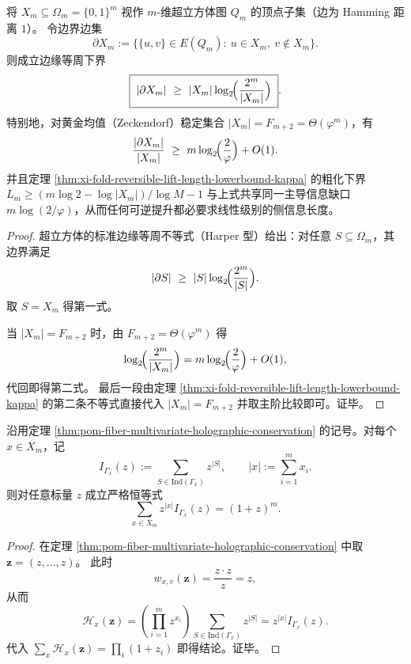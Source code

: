 \begin{proposition}[边界膨胀与信息缺口的同尺度性]\label{prop:xi-fold-boundary-info-gap-same-scale}
将 \(X_m\subseteq\Omega_m=\{0,1\}^m\) 视作 \(m\)-维超立方体图 \(Q_m\) 的顶点子集（边为 Hamming 距离 \(1\)）。
令边界边集
\[
\partial X_m:=\bigl\{\{u,v\}\in E(Q_m):\ u\in X_m,\ v\notin X_m\bigr\}.
\]
则成立边缘等周下界
\[
\boxed{\;
|\partial X_m|
\ \ge\
|X_m|\log_2\!\Bigl(\frac{2^m}{|X_m|}\Bigr)\; }.
\]
特别地，对黄金均值（Zeckendorf）稳定集合 \(|X_m|=F_{m+2}=\Theta(\varphi^m)\)，有
\[
\frac{|\partial X_m|}{|X_m|}
\ \ge\
m\log_2\!\Bigl(\frac{2}{\varphi}\Bigr)+O(1).
\]
并且定理 \ref{thm:xi-fold-reversible-lift-length-lowerbound-kappa} 的粗化下界
\(
L_m\ge (m\log2-\log|X_m|)/\log M-1
\)
与上式共享同一主导信息缺口 \(m\log(2/\varphi)\)，从而任何可逆提升都必要求线性级别的侧信息长度。
\end{proposition}
\begin{proof}
超立方体的标准边缘等周不等式（Harper 型）给出：对任意 \(S\subseteq\Omega_m\)，其边界满足
\[
|\partial S|\ \ge\ |S|\log_2\!\Bigl(\frac{2^m}{|S|}\Bigr).
\]
取 \(S=X_m\) 得第一式。
\par
当 \(|X_m|=F_{m+2}\) 时，由 \(F_{m+2}=\Theta(\varphi^m)\) 得
\[
\log_2\!\Bigl(\frac{2^m}{|X_m|}\Bigr)
=m\log_2\!\Bigl(\frac{2}{\varphi}\Bigr)+O(1),
\]
代回即得第二式。
最后一段由定理 \ref{thm:xi-fold-reversible-lift-length-lowerbound-kappa} 的第二条不等式直接代入 \(|X_m|=F_{m+2}\) 并取主阶比较即可。证毕。
\end{proof}

\begin{theorem}[一变量全息守恒的纤维独立集分解]\label{thm:xi-fold-univariate-holographic-conservation}
沿用定理 \ref{thm:pom-fiber-multivariate-holographic-conservation} 的记号。对每个 \(x\in X_m\)，记
\[
I_{\Gamma_x}(z):=\sum_{S\in\mathrm{Ind}(\Gamma_x)} z^{|S|},
\qquad
|x|:=\sum_{i=1}^m x_i.
\]
则对任意标量 \(z\) 成立严格恒等式
\[
\sum_{x\in X_m} z^{|x|}I_{\Gamma_x}(z)=(1+z)^m.
\]
\end{theorem}
\begin{proof}
在定理 \ref{thm:pom-fiber-multivariate-holographic-conservation} 中取
\(
\boldsymbol z=(z,\dots,z)
\)。
此时
\[
w_{x,v}(\boldsymbol z)=\frac{z\cdot z}{z}=z,
\]
从而
\[
\mathcal H_x(\boldsymbol z)
=\left(\prod_{i=1}^m z^{x_i}\right)\sum_{S\in\mathrm{Ind}(\Gamma_x)}z^{|S|}
=z^{|x|}I_{\Gamma_x}(z).
\]
代入
\(
\sum_x \mathcal H_x(\boldsymbol z)=\prod_i(1+z_i)
\)
即得结论。证毕。
\end{proof}

